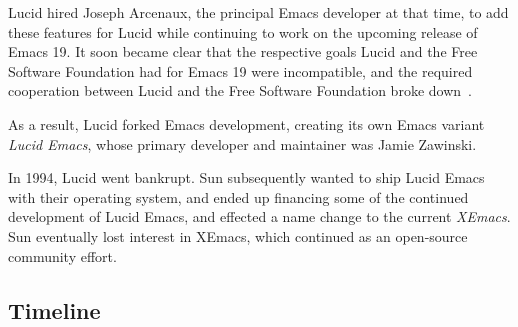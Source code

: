 \documentclass[format=acmsmall, review]{acmart}
\begin{document}
Lucid hired Joseph Arcenaux,
the principal Emacs developer at that time, to add these features
for Lucid while continuing to work on the upcoming release of Emacs
19.  It soon became clear that the respective goals Lucid and the Free
Software Foundation had for Emacs 19 were incompatible,
and the required cooperation between Lucid and
the Free Software Foundation broke down~\cite{Arcenaux-interview}.

As a result, Lucid forked Emacs development, creating its own Emacs
variant \emph{Lucid Emacs}, whose primary developer and maintainer was
Jamie Zawinski.

In 1994, Lucid went bankrupt.  Sun subsequently wanted to ship
Lucid Emacs with their operating system, and ended up financing some
of the continued development of Lucid Emacs, and effected a name
change to the current \emph{XEmacs}.
Sun eventually lost interest in XEmacs, which continued as an
open-source community effort.

\subsection{Timeline}


\newcommand \EDate [2] {#1}     %
\end{document}
